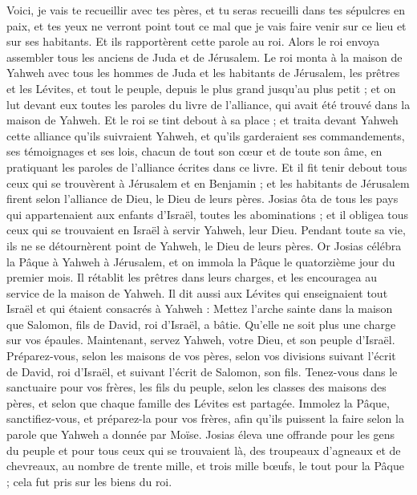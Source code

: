 \begin{multicols}{2}
Voici, je vais te recueillir avec tes pères, et tu seras recueilli dans tes sépulcres en paix, et tes yeux ne verront point tout ce mal que je vais faire venir sur ce lieu et sur ses habitants. Et ils rapportèrent cette parole au roi.
Alors le roi envoya assembler tous les anciens de Juda et de Jérusalem.
Le roi monta à la maison de Yahweh avec tous les hommes de Juda et les habitants de Jérusalem, les prêtres et les Lévites, et tout le peuple, depuis le plus grand jusqu'au plus petit ; et on lut devant eux toutes les paroles du livre de l'alliance, qui avait été trouvé dans la maison de Yahweh.
Et le roi se tint debout à sa place ; et traita devant Yahweh cette alliance qu'ils suivraient Yahweh, et qu'ils garderaient ses commandements, ses témoignages et ses lois, chacun de tout son cœur et de toute son âme, en pratiquant les paroles de l'alliance écrites dans ce livre.
Et il fit tenir debout tous ceux qui se trouvèrent à Jérusalem et en Benjamin ; et les habitants de Jérusalem firent selon l'alliance de Dieu, le Dieu de leurs pères.
Josias ôta de tous les pays qui appartenaient aux enfants d'Israël, toutes les abominations ; et il obligea tous ceux qui se trouvaient en Israël à servir Yahweh, leur Dieu. Pendant toute sa vie, ils ne se détournèrent point de Yahweh, le Dieu de leurs pères.
\VerseOne{}Or Josias célébra la Pâque à Yahweh à Jérusalem, et on immola la Pâque le quatorzième jour du premier mois.
Il rétablit les prêtres dans leurs charges, et les encouragea au service de la maison de Yahweh.
Il dit aussi aux Lévites qui enseignaient tout Israël et qui étaient consacrés à Yahweh : Mettez l'arche sainte dans la maison que Salomon, fils de David, roi d'Israël, a bâtie. Qu'elle ne soit plus une charge sur vos épaules. Maintenant, servez Yahweh, votre Dieu, et son peuple d'Israël.
Préparez-vous, selon les maisons de vos pères, selon vos divisions suivant l'écrit de David, roi d'Israël, et suivant l'écrit de Salomon, son fils.
Tenez-vous dans le sanctuaire pour vos frères, les fils du peuple, selon les classes des maisons des pères, et selon que chaque famille des Lévites est partagée.
Immolez la Pâque, sanctifiez-vous, et préparez-la pour vos frères, afin qu'ils puissent la faire selon la parole que Yahweh a donnée par Moïse.
Josias éleva une offrande pour les gens du peuple et pour tous ceux qui se trouvaient là, des troupeaux d'agneaux et de chevreaux, au nombre de trente mille, et trois mille bœufs, le tout pour la Pâque ; cela fut pris sur les biens du roi.

\end{multicols}
